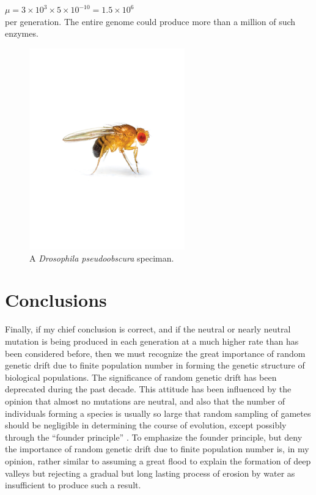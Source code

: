 \documentclass[12pt]{article}
\begin{document}
$\mu = 3 \times 10^3 \times 5 \times 10^{-10} = 1.5 \times 10^6$\\

per generation.  The entire genome could produce more than a million of such enzymes.\\

\begin{figure}[!ht]
\centering
\includegraphics[width=0.6\textwidth]{drosophila}
\caption{A {\it Drosophila pseudoobscura} speciman.}
\end{figure}

\newpage

\section{Conclusions}

Finally, if my chief conclusion is correct, and if the neutral or nearly neutral mutation is being produced in each generation at a much higher rate than has been considered before, then we must recognize the great importance of random genetic drift due to finite population number \citep{wright1931evolution} in forming the genetic structure of biological populations.  The significance of random genetic drift has been deprecated during the past decade.  This attitude has been influenced by the opinion that almost no mutations are neutral, and also that the number of individuals forming a species is usually so large that random sampling of gametes should be negligible in determining the course of evolution, except possibly through the ``founder principle'' \citep{mayr1965animal}. To emphasize the founder principle, but deny the importance of random genetic drift due to finite population number is, in my opinion, rather similar to assuming a great flood to explain the formation of deep valleys but rejecting a gradual but long lasting process of erosion by water as insufficient to produce such a result.


\newpage



\end{document}
